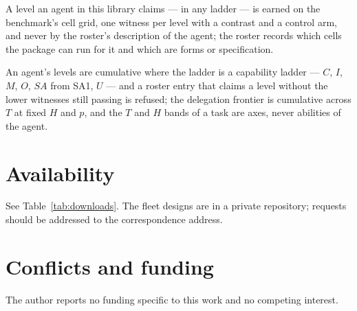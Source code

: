 A level an agent in this library claims --- in any ladder --- is earned on the benchmark's cell grid, one witness per level with a contrast and a control arm, and never by the roster's description of the agent; the roster records which cells the package can run for it and which are forms or specification.

An agent's levels are cumulative where the ladder is a capability ladder --- $C$, $I$, $M$, $O$, $SA$ from SA1, $U$ --- and a roster entry that claims a level without the lower witnesses still passing is refused; the delegation frontier is cumulative across $T$ at fixed $H$ and $p$, and the $T$ and $H$ bands of a task are axes, never abilities of the agent.

\section*{Availability}

See Table~\ref{tab:downloads}. The fleet designs are in a private repository; requests should be addressed to the correspondence address.

\section*{Conflicts and funding}

The author reports no funding specific to this work and no competing interest.

